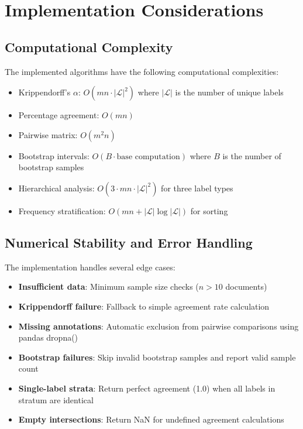 \documentclass[11pt]{article}
\begin{document}
\section{Implementation Considerations}

\subsection{Computational Complexity}

The implemented algorithms have the following computational complexities:
\begin{itemize}
\item Krippendorff's $\alpha$: $O(mn \cdot |\mathcal{L}|^2)$ where $|\mathcal{L}|$ is the number of unique labels
\item Percentage agreement: $O(mn)$
\item Pairwise matrix: $O(m^2 n)$
\item Bootstrap intervals: $O(B \cdot \text{base computation})$ where $B$ is the number of bootstrap samples
\item Hierarchical analysis: $O(3 \cdot mn \cdot |\mathcal{L}|^2)$ for three label types
\item Frequency stratification: $O(mn + |\mathcal{L}| \log |\mathcal{L}|)$ for sorting
\end{itemize}

\subsection{Numerical Stability and Error Handling}

The implementation handles several edge cases:

\begin{itemize}
\item \textbf{Insufficient data}: Minimum sample size checks ($n > 10$ documents)
\item \textbf{Krippendorff failure}: Fallback to simple agreement rate calculation
\item \textbf{Missing annotations}: Automatic exclusion from pairwise comparisons using pandas dropna()
\item \textbf{Bootstrap failures}: Skip invalid bootstrap samples and report valid sample count
\item \textbf{Single-label strata}: Return perfect agreement (1.0) when all labels in stratum are identical
\item \textbf{Empty intersections}: Return NaN for undefined agreement calculations
\end{itemize}
\end{document}
